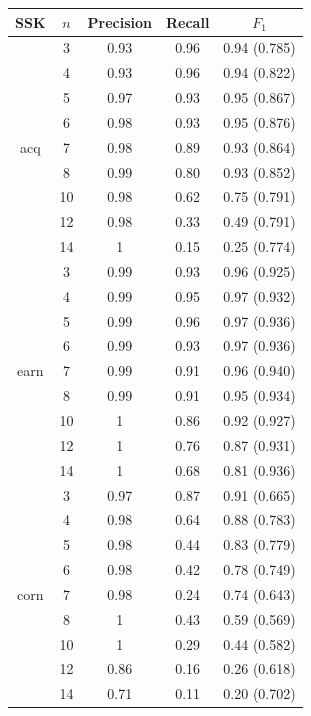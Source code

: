 \begin{table}
	
	\centering
	\small
	
	\begin{tabular}{| c | c | c | c | c | }
		\hline SSK& $ n $ & Precision & Recall & $ F_1 $   \\ \hline
		
		& 3 & 0.93 & 0.96 & 0.94 (0.785)    \\ 
		& 4 & 0.93 & 0.96 &  0.94  (0.822)  \\
		& 5 & 0.97 & 0.93 & 0.95  (0.867)   \\ 
		& 6 & 0.98 & 0.93 & 0.95 (0.876)    \\
		acq	& 7 & 0.98 & 0.89 & 0.93 (0.864)    \\
		& 8 & 0.99 & 0.80 & 0.93  (0.852)   \\
		& 10 & 0.98 & 0.62 & 0.75  (0.791)   \\
		& 12 & 0.98 & 0.33 & 0.49  (0.791)   \\
		& 14 & 1 & 0.15 & 0.25  (0.774)   \\ \hline
		
		
		
		& 3 & 0.99 & 0.93 & 0.96  (0.925)   \\ 
		& 4 & 0.99 & 0.95 &  0.97  (0.932) \\
		& 5 & 0.99 & 0.96 & 0.97   (0.936)  \\ 
		& 6 & 0.99 & 0.93 & 0.97  (0.936)   \\
		earn& 7 & 0.99 & 0.91 & 0.96 (0.940)    \\
		& 8 & 0.99 & 0.91 & 0.95  (0.934)   \\
		& 10 & 1 & 0.86 & 0.92  (0.927)   \\
		& 12 & 1 & 0.76 & 0.87  (0.931)   \\
		& 14 & 1 & 0.68 & 0.81  (0.936)   \\ \hline
		
		
		& 3 & 0.97 & 0.87 & 0.91  (0.665)   \\ 
		& 4 & 0.98 & 0.64 & 0.88  (0.783)   \\ 
		& 5 & 0.98 & 0.44 &  0.83  (0.779)  \\ 
		& 6 & 0.98 & 0.42 & 0.78   (0.749)  \\ 
		corn& 7 & 0.98 & 0.24 & 0.74  (0.643)  \\ 
		& 8 & 1 & 0.43& 0.59  (0.569)   \\ 
		& 10 & 1 & 0.29& 0.44  (0.582)   \\ 
		& 12 & 0.86 & 0.16& 0.26  (0.618)   \\ 
		& 14 & 0.71 & 0.11& 0.20  (0.702)   \\ 
		\hline
		

\end{tabular}
\end{table}

